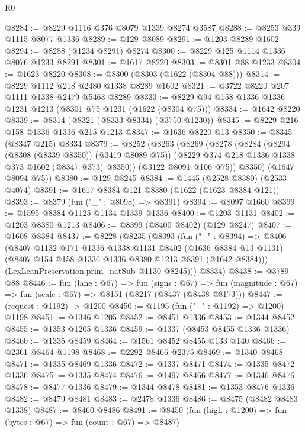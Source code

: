 \begin{lexlean}{R0}
\begin{coremodule}
@8284 := @8229 @1116 @376 @8079 @1339 @8274 @3587
@8288 := @8253 @339 @1115 @8077 @1336
@8289 := @129 @8089
@8291 := @1203 @8289 @1602
@8294 := @8288 (@1234 @8291) @8274
@8300 := @8229 @125 @1114 @1336 @8076 @1233 @8291
@8301 := @1617 @8220
@8303 := @8301 @88 @1233
@8304 := @1623 @8220
@8308 := @8300 (@8303 (@1622 (@8304 @88)))
@8314 := @8229 @1112 @218 @2480 @1338 @8289 @1602
@8321 := @3722 @8220 @207 @1111 @1338 @2479 @5463 @8289
@8333 := @8229 @94 @158 @1336 @1336 @1231 @1213 (@8301 @75 @1231 (@1622 (@8304 @75)))
@8334 := @1642 @8220
@8339 := @8314 (@8321 (@8333 @8334) (@3750 @1230))
@8345 := @8229 @216 @158 @1336 @1336 @215 @1213
@8347 := @1636 @8220 @13
@8350 := @8345 (@8347 @215) @8334
@8379 := @8252
    (@8263
      (@8269
        (@8278
          (@8284
            (@8294 (@8308 (@8339 @8350)) (@3419 @8089 @75))
            (@8229 @374 @218 @1336 @1338 @373 @1602 (@8347 @373) @8350))
          (@3122 @8091 @106 @75))
        @8350)
      (@1647 @8094 @75))
@8380 := @129 @8245
@8384 := @1445 (@2528 @8380) (@2533 @4074)
@8391 := @1617 @8384 @121 @8380 (@1622 (@1623 @8384 @121))
@8393 := @8379 (fun ("_" : @8098) => @8391)
@8394 := @8097 @1660
@8399 := @1595 @8384 @1125 @1134 @1339 @1336
@8400 := @1203 @1131
@8402 := @1203 @8380 @1213
@8406 := @8399 (@8400 @8402) (@129 @8247)
@8407 := @1608 @8384
@8437 := @8228
    (@8235
      (@8393
        (fun ("_" : @8394) =>
        @8406
          (@8407
            @1132
            @171
            @1336
            @1338
            @1131
            @8402
            (@1636 @8384 @13 @1131)
            (@8407 @154 @158 @1336 @1336 @8380 @1213 @8391 (@1642 @8384)))
          (LexLeanPreservation.prim_natSub @1130 @8245)))
      @8334)
@8438 := @3789 @88
@8446 := fun (lane : @67) =>
  fun (signs : @67) =>
  fun (magnitude : @67) => fun (scale : @67) => @8151 (@8217 (@8437 (@8438 @8173)))
@8447 := (request : @1192) -> @1200
@8450 := @1195 (fun ("_" : @1192) => @1200) @1198
@8451 := @1346 @1205
@8452 := @8451 @1336
@8453 := @1344 @8452
@8455 := @1353 @1205 @1336
@8459 := @1337 (@8453 @8455 @1336 @1336)
@8460 := @1335 @8459
@8464 := @1561 @8452 @8455 @133 @140
@8466 := @2361 @8464 @1198
@8468 := @2292 @8466 @2375
@8469 := @1340 @8468
@8471 := @1335 @8469 @1336
@8472 := @1337 @8471
@8474 := @1335 @8472 @1336
@8475 := @1335 @8474
@8476 := @1497 @8466
@8477 := @1346 @8476
@8478 := @8477 @1336
@8479 := @1344 @8478
@8481 := @1353 @8476 @1336
@8482 := @8479 @8481
@8483 := @2478 @1336
@8486 := @8475 (@8482 @8483 @1338)
@8487 := @8460 @8486
@8491 := @8450 (fun (high : @1200) => fun (bytes : @67) => fun (count : @67) => @8487)

\end{coremodule}
\end{lexlean}
